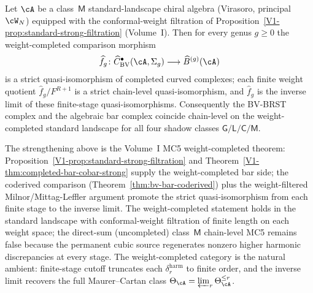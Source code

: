 \begin{proposition}
\label{prop:bv-bar-class-m-weight-completed}
%
%
%
Let $\cA$ be a class~$\mathsf{M}$ standard-landscape chiral algebra
\textup{(}Virasoro, principal $\cW_N$\textup{)} equipped with the
conformal-weight filtration of
Proposition~\ref{V1-prop:standard-strong-filtration} \textup{(}Volume~I\textup{)}.
Then for every genus $g \geq 0$ the weight-completed comparison
morphism
\[
 \widehat f_g \colon
 \widehat C^{\bullet}_{\mathrm{BV}}(\cA, \Sigma_g)
 \longrightarrow
 \widehat B^{(g)}(\cA)
\]
is a strict quasi-isomorphism of completed curved complexes; each
finite weight quotient $\widehat f_g / F^{R+1}$ is a strict chain-level
quasi-isomorphism, and $\widehat f_g$ is the inverse limit of these
finite-stage quasi-isomorphisms. Consequently the BV-BRST complex and
the algebraic bar complex coincide chain-level on the weight-completed
standard landscape for all four shadow classes $\mathsf{G/L/C/M}$.
\end{proposition}
\begin{remark}
\label{rem:bv-bar-class-m-weight-completed-attribution}
The strengthening above is the Volume~I MC5 weight-completed theorem:
Proposition~\ref{V1-prop:standard-strong-filtration} and
Theorem~\ref{V1-thm:completed-bar-cobar-strong} supply the
weight-completed bar side; the coderived comparison
\textup{(}Theorem~\ref{thm:bv-bar-coderived}\textup{)} plus the
weight-filtered Milnor/Mittag-Leffler argument promote the strict
quasi-isomorphism from each finite stage to the inverse limit.
The weight-completed statement holds in
the standard landscape with conformal-weight filtration of finite
length on each weight space; the direct-sum \textup{(}uncompleted\textup{)}
class~$\mathsf{M}$ chain-level MC5 remains false because the
permanent cubic source regenerates nonzero higher harmonic
discrepancies at every stage. The weight-completed category is the
natural ambient: finite-stage cutoff truncates each $\delta_r^{\mathrm{harm}}$
to finite order, and the inverse limit recovers the full
Maurer--Cartan class $\Theta_\cA = \varprojlim_r \Theta_\cA^{\le r}$.
\end{remark}

